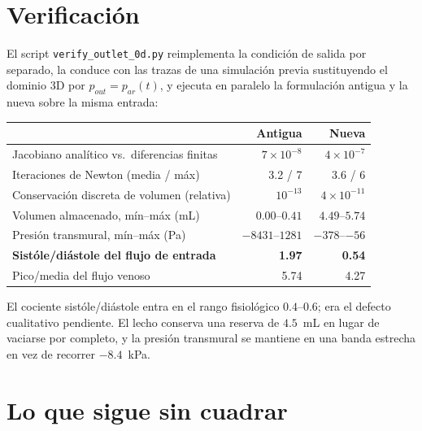 \documentclass[11pt]{article}
\begin{document}
\section{Verificaci\'on}

El script \texttt{verify\_outlet\_0d.py} reimplementa la condici\'on de salida
por separado, la conduce con las trazas de una simulaci\'on previa sustituyendo
el dominio 3D por $p_{out}=p_{ar}(t)$, y ejecuta en paralelo la formulaci\'on
antigua y la nueva sobre la misma entrada:

\begin{center}\small
\begin{tabular}{lrr}
\toprule
 & Antigua & Nueva\\
\midrule
Jacobiano anal\'itico vs.\ diferencias finitas & $7\times10^{-8}$ & $4\times10^{-7}$\\
Iteraciones de Newton (media / m\'ax) & 3.2 / 7 & 3.6 / 6\\
Conservaci\'on discreta de volumen (relativa) & $10^{-13}$ & $4\times10^{-11}$\\
Volumen almacenado, m\'in--m\'ax (mL) & $0.00$--$0.41$ & $4.49$--$5.74$\\
Presi\'on transmural, m\'in--m\'ax (Pa) & $-8431$--$1281$ & $-378$--$-56$\\
\textbf{Sist\'ole/di\'astole del flujo de entrada} & \textbf{1.97} & \textbf{0.54}\\
Pico/media del flujo venoso & 5.74 & 4.27\\
\bottomrule
\end{tabular}
\end{center}

\noindent
El cociente sist\'ole/di\'astole entra en el rango fisiol\'ogico $0.4$--$0.6$;
era el defecto cualitativo pendiente. El lecho conserva una reserva de $4.5$~mL
en lugar de vaciarse por completo, y la presi\'on transmural se mantiene en una
banda estrecha en vez de recorrer $-8.4$~kPa.

\section{Lo que sigue sin cuadrar}
\end{document}

